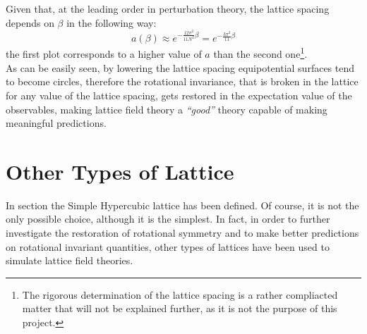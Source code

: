 Given that, at the leading order in perturbation theory, the lattice spacing depends on $\beta$ in the following way:
\begin{equation}
    a(\beta) \approx e^{-\frac{12\pi^2}{11N^2}\beta} = e^{-\frac{3\pi^2}{11}\beta} \label{3:BetaLatticeSpacing} 
\end{equation}
the first plot corresponds to a higher value of $a$ than the second one\footnote{The rigorous determination of the lattice spacing is a rather compliacted matter that will not be explained further, as it is not the purpose of this project.}.\\
As can be easily seen, by lowering the lattice spacing equipotential surfaces tend to become circles, therefore the rotational invariance, that is broken in the lattice for any value of the lattice spacing, gets restored in the expectation value of the observables, making lattice field theory a \emph{``good''} theory capable of making meaningful predictions.

\section{Other Types of Lattice\label{Sec3:Lattices}}
In section the Simple Hypercubic lattice has been defined.
Of course, it is not the only possible choice, although it is the simplest.
In fact, in order to further investigate the restoration of rotational symmetry and to make better predictions on rotational invariant quantities, other types of lattices have been used to simulate lattice field theories.

